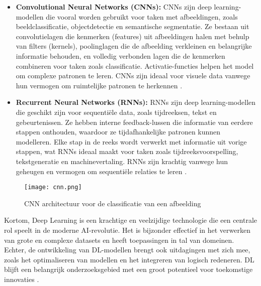 \begin{itemize}
    \item \textbf{Convolutional Neural Networks (CNNs):} 
    CNNs zijn deep learning-modellen die vooral worden gebruikt voor taken met afbeeldingen, zoals beeldclassificatie, objectdetectie en semantische segmentatie. Ze bestaan uit convolutielagen die kenmerken (features) uit afbeeldingen halen met behulp van filters (kernels), poolinglagen die de afbeelding verkleinen en belangrijke informatie behouden, en volledig verbonden lagen die de kenmerken combineren voor taken zoals classificatie. Activatie-functies helpen het model om complexe patronen te leren. CNNs zijn ideaal voor visuele data vanwege hun vermogen om ruimtelijke patronen te herkennen \autocite{ZhaoEtAl2024}.

    \item \textbf{Recurrent Neural Networks (RNNs):} 
    RNNs zijn deep learning-modellen die geschikt zijn voor sequentiële data, zoals tijdreeksen, tekst en gebeurtenissen. Ze hebben interne feedback-lussen die informatie van eerdere stappen onthouden, waardoor ze tijdafhankelijke patronen kunnen modelleren. Elke stap in de reeks wordt verwerkt met informatie uit vorige stappen, wat RNNs ideaal maakt voor taken zoals tijdreeksvoorspelling, tekstgeneratie en machinevertaling. RNNs zijn krachtig vanwege hun geheugen en vermogen om sequentiële relaties te leren \autocite{JanieschEtAl2021}.
\end{itemize}

\begin{figure}
  \centering
  \texttt{[image: cnn.png]}
  \caption[CNN classificatie van een afbeelding]{\label{fig:cnn}CNN architectuur voor de classificatie van een afbeelding \autocite{ChaiEtAl2021}}
\end{figure}



Kortom, Deep Learning is een krachtige en veelzijdige technologie die een centrale rol speelt in de moderne AI-revolutie. 
Het is bijzonder effectief in het verwerken van grote en complexe datasets en heeft toepassingen in tal van domeinen. 
Echter, de ontwikkeling van DL-modellen brengt ook uitdagingen met zich mee, zoals het optimaliseren van modellen en het integreren van logisch redeneren. 
DL blijft een belangrijk onderzoeksgebied met een groot potentieel voor toekomstige innovaties \autocite{JiangEtAl2022}.

\subsection{}%
\label{subsec:computer-vision}

